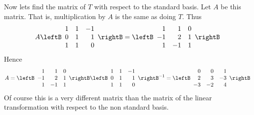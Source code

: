 \begin{solution}
Now lets find the matrix of $T$ with respect to the standard basis. Let $A$ be
this matrix. That is, multiplication by $A$ is the same as doing $T$. Thus 
\begin{equation*}
A\leftB 
\begin{array}{rrr}
1 & 1 & -1 \\ 
0 & 1 & 1 \\ 
1 & 1 & 0
\end{array}
\rightB =\leftB 
\begin{array}{rrr}
1 & 1 & 0 \\ 
-1 & 2 & 1 \\ 
1 & -1 & 1
\end{array}
\rightB
\end{equation*}
Hence 
\begin{equation*}
A=\leftB 
\begin{array}{rrr}
1 & 1 & 0 \\ 
-1 & 2 & 1 \\ 
1 & -1 & 1
\end{array}
\rightB \leftB 
\begin{array}{rrr}
1 & 1 & -1 \\ 
0 & 1 & 1 \\ 
1 & 1 & 0
\end{array}
\rightB ^{-1}=\leftB 
\begin{array}{rrr}
0 & 0 & 1 \\ 
2 & 3 & -3 \\ 
-3 & -2 & 4
\end{array}
\rightB
\end{equation*}
Of course this is a very different matrix than the matrix of the linear
transformation with respect to the non standard basis.
\end{solution}
